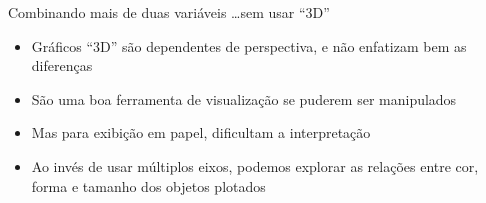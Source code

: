 \documentclass{beamer}\usepackage[]{graphicx}\usepackage[]{color}
\begin{document}
\begin{frame}{Combinando mais de duas variáveis \dots sem usar ``3D''}
  
\begin{itemize}
  \item Gráficos ``3D'' são dependentes de perspectiva, e não enfatizam bem as diferenças \pause
  \vfill
  \item São uma boa ferramenta de visualização se puderem ser manipulados \pause
  \vfill
  \item Mas para exibição em papel, dificultam a interpretação \pause
  \vfill
  \item Ao invés de usar múltiplos eixos, podemos explorar as relações entre cor, forma e tamanho dos objetos plotados 
\end{itemize}

\end{frame} 
\end{document}
